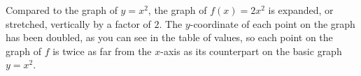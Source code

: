\documentclass[10pt,]{book}
\theoremstyle{plain}
\theoremstyle{definition}
\theoremstyle{definition}
\theoremstyle{definition}
\theoremstyle{definition}
\theoremstyle{definition}
\numberwithin{equation}{section}
\newcommand{\hrulethin}  {\noalign{\hrule height 0.04em}}
\newcommand{\hrulethick} {\noalign{\hrule height 0.11em}}
\newcounter{figstack}
\newcounter{figindex}
\newlength\fight
\newcommand\pushValignCaptionBottom[5][b]{%
\stepcounter{figstack}%
\expandafter\def\csname %
figalign\romannumeral\value{figstack}\endcsname{#1}%
\expandafter\def\csname %
figtype\romannumeral\value{figstack}\endcsname{#2}%
\expandafter\def\csname %
figwd\romannumeral\value{figstack}\endcsname{#3}%
\expandafter\def\csname %
figcontent\romannumeral\value{figstack}\endcsname{#4}%
\expandafter\def\csname %
figcap\romannumeral\value{figstack}\endcsname{#5}%
\setbox0=\hbox{%
\begin{#2}{#3}#4\end{#2}}%
\ifdim\dimexpr\ht0+\dp0\relax>\fight\global\setlength{\fight}{%
\dimexpr\ht0+\dp0\relax}\fi%
}
\newcommand\popValignCaptionBottom{%
\setcounter{figindex}{0}%
\hfill%
\whiledo{\value{figindex}<\value{figstack}}{%
\stepcounter{figindex}%
\def\tmp{\csname figwd\romannumeral\value{figindex}\endcsname}%
\begin{\csname figtype\romannumeral\value{figindex}\endcsname}[t]{\tmp}%
\centering%
\stackinset{c}{}%
{\csname figalign\romannumeral\value{figindex}\endcsname}{}%
{\csname figcontent\romannumeral\value{figindex}\endcsname}%
{\rule{0pt}{\fight}}\par%
\csname figcap\romannumeral\value{figindex}\endcsname%
\end{\csname figtype\romannumeral\value{figindex}\endcsname}%
\hfill%
}%
\setcounter{figstack}{0}%
\setlength{\fight}{0pt}%
\hfill%
}
\begin{document}
    Compared to the graph of \(y = x^2\), the graph of \(f (x) = 2x^2\) is expanded, or stretched, vertically by a factor of \(2\). The \(y\)-coordinate of each point on the graph has been doubled, as you can see in the table of values, so each point on the graph of \(f\) is twice as far from the \(x\)-axis as its counterpart on the basic graph \(y = x^2\).
%
\leavevmode%
\par
\end{document}
